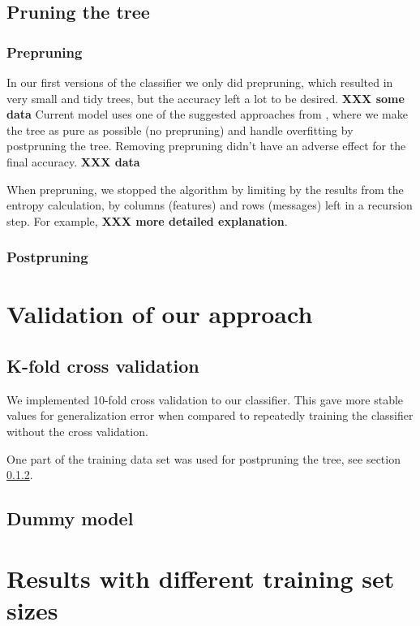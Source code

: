 \documentclass[a4paper,10pt]{article}
\newcommand{\XXX}[1]{{\bf XXX #1}}
\begin{document}
\subsection{Pruning the tree}

\subsubsection{Prepruning}

In our first versions of the classifier we only did prepruning, which
resulted in very small and tidy trees, but the accuracy left a lot to be
desired. \XXX{some data} Current model uses one of the suggested
approaches from \cite{alpaydin2004}, where we make the tree as pure as
possible (no prepruning) and handle overfitting by postpruning the tree.
Removing prepruning didn't have an adverse effect for the final
accuracy. \XXX{data}

When prepruning, we stopped the algorithm by limiting by the results
from the entropy calculation, by columns (features) and rows (messages)
left in a recursion step.  For example, \XXX{more detailed explanation}.

\subsubsection{Postpruning}
\label{sect:postpruning}



\section{Validation of our approach}

\subsection{K-fold cross validation}

We implemented 10-fold cross validation to our classifier.  This
gave more stable values for generalization error when compared to
repeatedly training the classifier without the cross validation.

One part of the training data set was used for postpruning the tree, see
section \ref{sect:postpruning}.

\subsection{Dummy model}


\section{Results with different training set sizes}
\end{document}
